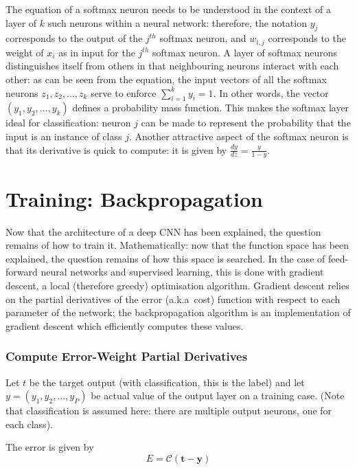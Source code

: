 \documentclass[a4paper,11pt]{article}
\begin{document}
The equation of a softmax neuron needs to be understood in the context of a layer of $k$ such neurons within a neural network: therefore, the notation $y_{j}$ corresponds to the output of the $j^{th}$ softmax neuron, and $w_{i,j}$ corresponds to the weight of $x_{i}$ as in input for the $j^{th}$ softmax neuron. A layer of softmax neurons distinguishes itself from others in that neighbouring neurons interact with each other: as can be seen from the equation, the input vectors of all the softmax neurons $z_{1}, z_{2}, ..., z_{k}$ serve to enforce $\sum\limits_{i=1}^k y_{i} = 1$. In other words, the vector $(y_{1}, y_{2}, ..., y_{k})$ defines a probability mass function. This makes the softmax layer ideal for classification: neuron $j$ can be made to represent the probability that the input is an instance of class $j$. Another attractive aspect of the softmax neuron is that its derivative is quick to compute: it is given by $\frac{dy}{dz} = \frac{y}{1-y}$.


\section{Training: Backpropagation}

Now that the architecture of a deep CNN has been explained, the question remains of how to train it. Mathematically: now that the function space has been explained, the question remains of how this space is searched. In the case of feed-forward neural networks and supervised learning, this is done with gradient descent, a local (therefore greedy) optimisation algorithm. Gradient descent relies on the partial derivatives of the error (a.k.a\ cost) function with respect to each parameter of the network; the backpropagation algorithm is an implementation of gradient descent which efficiently computes these values.
  
\subsubsection{Compute Error-Weight Partial Derivatives}

Let $t$ be the target output (with classification, this is the label) and let $y = (y_{1}, y_{2}, ..., y_{P})$ be actual value of the output layer on a training case. (Note that classification is assumed here: there are multiple output neurons, one for each class).

The error is given by 
\begin{equation}
E = \mathcal{C}(\textbf{t}-\textbf{y})
\end{equation}
\end{document}
